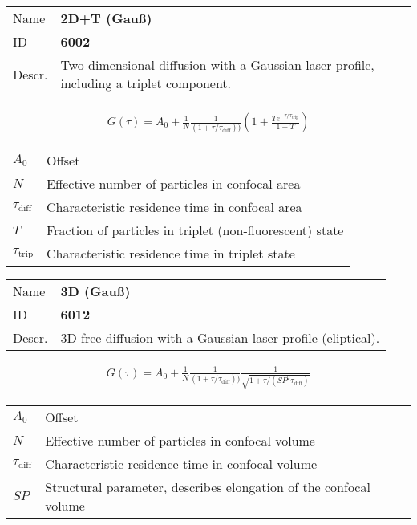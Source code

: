 \noindent \begin{tabular}{lp{}}
Name & \textbf{2D+T (Gauß)} \\ 
ID & \textbf{6002} \\ 
Descr. &  Two-dimensional diffusion with a Gaussian laser profile, including a triplet component. \\ 
\end{tabular}
\begin{align}
G(\tau) = A_0 + \frac{1}{N} \frac{1}{(1+\tau/\tau_\mathrm{diff}))}  \left(1 + \frac{T e^{-\tau/\tau_\mathrm{trip}}}{1-T}  \right)
\end{align} 
\begin{center}
\begin{tabular}{ll}
$A_0$ & Offset \\ 
$N$ & Effective number of particles in confocal area \\ 
$\tau_\mathrm{diff}$ &  Characteristic residence time in confocal area \\ 
$T$ &  Fraction of particles in triplet (non-fluorescent) state\\ 
$\tau_\mathrm{trip}$ &  Characteristic residence time in triplet state \\ 
\end{tabular}
\end{center}
\vspace{2em}


\noindent \begin{tabular}{lp{}}
Name & \textbf{3D (Gauß)} \\ 
ID & \textbf{6012} \\ 
Descr. &  3D free diffusion with a Gaussian laser profile (eliptical). \\ 
\end{tabular}
\begin{align}
G(\tau) = A_0 + \frac{1}{N} \frac{1}{(1+\tau/\tau_\mathrm{diff}))} \frac{1}{\sqrt{1+\tau/(\mathit{SP}^2 \tau_\mathrm{diff})}}
\end{align} 
\begin{center}
\begin{tabular}{ll}
$A_0$ & Offset \\ 
$N$ & Effective number of particles in confocal volume \\ 
$\tau_\mathrm{diff}$ &  Characteristic residence time in confocal volume \\ 
$\mathit{SP}$ & Structural parameter, describes elongation of the confocal volume \\
\end{tabular}
\end{center}
\vspace{2em}



